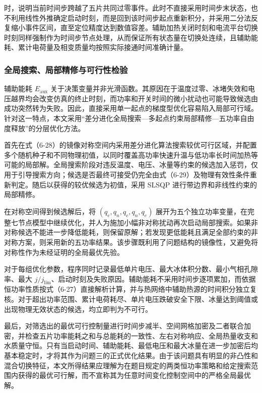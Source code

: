 \documentclass[bwprint]{gmcmthesis}
\numberwithin{figure}{section}
\begin{document}
\noindent 时，说明当前时间步跨越了五片共同过零事件。此时不直接采用时间步末状态，也不利用线性外推确定启动时刻，而是回到该时间步起点重新积分，并采用二分法反复缩小事件区间，直至定位精度达到数值容差。辅助加热关闭时刻和电流平台切换时刻同样强制作为时间步节点处理，从而保证所有状态量在切换处连续，且辅助能耗、累计电荷量及相变质量均按照实际接通时间准确计量。

\subsubsection{全局搜索、局部精修与可行性检验}

\noindent 辅助能耗 \(E_{\text{aux}}\) 关于决策变量并非光滑函数。其原因在于温度过零、冰堵失效和电压越界均会改变仿真的终止时刻，而功率和开关时间的微小扰动也可能导致候选由成功突然转为失败。因此，直接采用单一起点的梯度型优化容易陷入局部可行域。针对这一特点，本文采用“差分进化全局搜索—多起点约束局部精修—五功率自由度释放”的分层优化方法。

\noindent 首先在式（6-28）的镜像对称空间内采用差分进化算法搜索较优可行区域，并配置多个随机种子和不同物理初值，以同时覆盖高功率快速升温与低功率长时间加热等可能的局部解。全局搜索阶段对违反温度、电压、冰量等约束的候选加入惩罚，仅用于引导搜索方向；候选是否最终可接受仍完全由式（6-29）及物理有效性条件重新判定。随后以获得的较优候选为初值，采用 SLSQP 进行带边界和非线性约束的局部精修。

\noindent 在对称空间得到候选解后，将 \((q_e, q_n, q_c, q_n, q_e)\) 展开为五个独立功率变量，在完整七节点模型中继续优化，并人为施加小幅非对称扰动再次启动局部搜索。如果非对称候选不能进一步降低能耗，则保留原解；若发现更低能耗且满足全部约束的非对称方案，则采用新的五功率结果。该步骤既利用了问题结构的镜像性，又避免将对称性作为未经证明的全局最优先验。

\noindent 对于每组优化参数，程序同时记录最低单片电压、最大冰体积分数、最小气相孔隙率、最大 \(j/j_{\text{lim}}\)、启动时刻及失败原因。辅助能耗不采用时间步逐项累加，而依据恒功率性质按式（6-27）直接解析计算，并与热网络中辅助热源的时间积分独立复核。对于超出功率范围、累计电荷耗尽、单片电压跌破安全下限、冰量达到阈值或出现物理无效状态的候选，均立即判为不可行。

\noindent 最后，对筛选出的最优可行控制量进行时间步减半、空间网格加密及二者联合加密，并检查五片功率能耗之和与总能耗的一致性、左右对称响应、全局热量收支和水质量守恒。只有当启动时间、辅助能耗、最低电压和最大冰量在进一步加密后均基本稳定时，才将其作为问题三的正式优化结果。由于该问题具有明显的非凸性和混合切换特征，本文所得结果应理解为在题目规定的两类恒功率策略和给定搜索范围内获得的最优可行解，而不宣称其为任意时间变化控制空间中的严格全局最优解。
\end{document}
